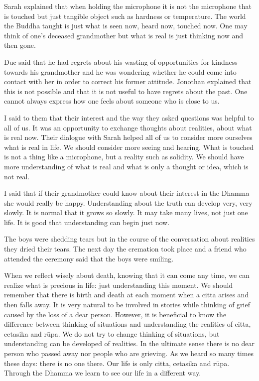 Sarah explained that when holding the microphone it is not the
microphone that is touched but just tangible object such as hardness or
temperature. The world the Buddha taught is just what is seen now, heard
now, touched now. One may think of one's deceased grandmother but what
is real is just thinking now and then gone.

Duc said that he had regrets about his wasting of opportunities for
kindness towards his grandmother and he was wondering whether he could
come into contact with her in order to correct his former attitude.
Jonothan explained that this is not possible and that it is not useful
to have regrets about the past. One cannot always express how one feels
about someone who is close to us.

I said to them that their interest and the way they asked questions was
helpful to all of us. It was an opportunity to exchange thoughts about
realities, about what is real now. Their dialogue with Sarah helped all
of us to consider more ourselves what is real in life. We should
consider more seeing and hearing. What is touched is not a thing like a
microphone, but a reality such as solidity. We should have more
understanding of what is real and what is only a thought or idea, which
is not real.

I said that if their grandmother could know about their interest in the
Dhamma she would really be happy. Understanding about the truth can
develop very, very slowly. It is normal that it grows so slowly. It may
take many lives, not just one life. It is good that understanding can
begin just now.

The boys were shedding tears but in the course of the conversation about
realities they dried their tears. The next day the cremation took place
and a friend who attended the ceremony said that the boys were smiling.

When we reflect wisely about death, knowing that it can come any time,
we can realize what is precious in life: just understanding this moment.
We should remember that there is birth and death at each moment when a
citta arises and then falls away. It is very natural to be involved in
stories while thinking of grief caused by the loss of a dear person.
However, it is beneficial to know the difference between thinking of
situations and understanding the realities of citta, cetasika and rūpa.
We do not try to change thinking of situations, but understanding can be
developed of realities. In the ultimate sense there is no dear person
who passed away nor people who are grieving. As we heard so many times
these days: there is no one there. Our life is only citta, cetasika and
rūpa. Through the Dhamma we learn to see our life in a different way.

